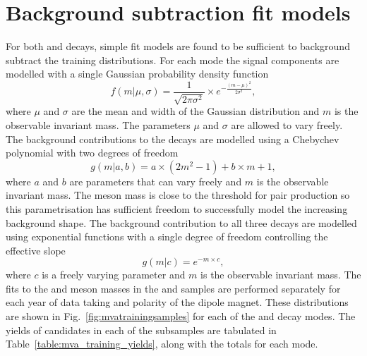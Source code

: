 \section{Background subtraction fit models}
\label{sec:app_mva_fit_models}

For both \decay{\Bs}{\jpsi\phiz} and \decay{\Bsb}{\Dsp\pim} decays, simple fit models are found to be sufficient to background subtract the training distributions.
For each mode the signal components are modelled with a single Gaussian probability density function
\begin{equation}
f(m|\mu,\sigma) = \frac{1}{\sqrt{2\pi\sigma^{2}}} \times e^{-\frac{(m-\mu)^{2}}{2\sigma^{2}}}, 
\end{equation}
where $\mu$ and $\sigma$ are the mean and width of the Gaussian distribution and $m$ is the observable invariant mass. The parameters $\mu$ and $\sigma$ are allowed to vary freely.
The background contributions to the \decay{\phiz}{\Kp\Km} decays are modelled using a Chebychev polynomial with two degrees of freedom
\begin{equation}
g(m|a,b) = a\times(2m^{2}-1) + b\times m + 1,
\end{equation}
where $a$ and $b$ are parameters that can vary freely and $m$ is the observable invariant mass. 
The \phiz meson mass is close to the threshold for \Kp\Km pair production so this parametrisation has sufficient freedom to successfully  model the increasing background shape.
The background contribution to all three \Dsp decays are modelled using exponential functions with a single degree of freedom controlling the effective slope
\begin{equation}
g(m|c) = e^{-m\times c},
\end{equation}
where $c$ is a freely varying parameter and $m$ is the observable invariant mass.
The fits to the \phiz and \Dsp meson masses in the \decay{\Bs}{\jpsi\phiz} and \decay{\Bsb}{\Dsp\pim} samples are performed separately for each year of data taking and polarity of the \lhcb dipole magnet. These distributions are shown in Fig.~\ref{fig:mvatrainingsamples} for each of the \phiz and \Dsp decay modes.
The yields of candidates in each of the subsamples are tabulated in Table~\ref{table:mva_training_yields}, along with the totals for each mode. 


